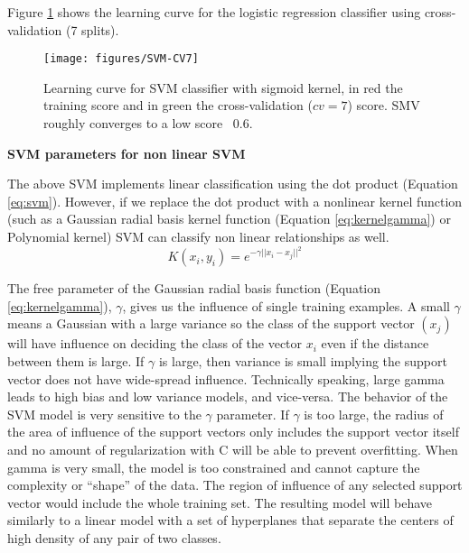\documentclass[11pt]{article}
\begin{document}
Figure \ref{fig:svm-cv7} shows the learning curve for the logistic regression classifier using cross-validation (7 splits).
\begin{figure}[H]
        \centering
        \texttt{[image: figures/SVM-CV7]}
        \caption{Learning curve for SVM classifier with sigmoid kernel, in red the training score and in green the cross-validation ($cv=7$) score. SMV roughly converges to a low score ~0.6.
        }
\label{fig:svm-cv7}
\end{figure}

\textbf{SVM parameters for non linear SVM}

The above SVM implements linear classification using the dot product (Equation \ref{eq:svm}). However, if we replace the dot product with a nonlinear kernel function (such as a Gaussian radial basis kernel function (Equation \ref{eq:kernelgamma}) or Polynomial kernel) SVM can classify non linear relationships as well.
\begin{equation} \label{eq:kernelgamma}
K(x_i,y_i) = e^{-\gamma ||x_i-x_j||^2}
\end{equation}

The free parameter of the Gaussian radial basis function (Equation \ref{eq:kernelgamma}), $\gamma$, gives us the influence of  single training examples. 
A small  $\gamma$ means a Gaussian with a large variance so the class of the support vector $(x_j)$ will have influence on deciding the class of the vector $x_i$ even if the distance between them is large. If  $\gamma$ is large, then variance is small implying the support vector does not have wide-spread influence. Technically speaking, large gamma leads to high bias and low variance models, and vice-versa.
The behavior of the SVM model is very sensitive to the $\gamma$ parameter. If $\gamma$ is too large, the radius of the area of influence of the support vectors only includes the support vector itself and no amount of regularization with C will be able to prevent overfitting.
When gamma is very small, the model is too constrained and cannot capture the complexity or “shape” of the data. The region of influence of any selected support vector would include the whole training set. The resulting model will behave similarly to a linear model with a set of hyperplanes that separate the centers of high density of any pair of two classes.
\end{document}
